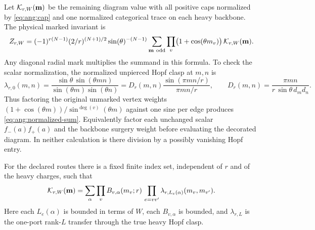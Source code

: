 Let \({\cal K}_{r,W}(\mathbf m)\) be the remaining diagram value with all positive caps normalized by \eqref{eq:ang:cap} and one normalized categorical trace on each heavy backbone. The physical marked invariant is
\begin{equation}
 \label{eq:ang:normalized-sum}
 Z_{r,W}=(-1)^{r(N-1)}
      (2/r)^{(N+1)/2}\sin(\theta)^{-(N-1)}
      \sum_{\mathbf m\ {\rm odd}}
        \prod_v \bigl(1+\cos(\theta m_v)\bigr)\,
                            {\cal K}_{r,W}(\mathbf m).
\end{equation}
Any diagonal radial mark multiplies the summand in this formula. To check the scalar normalization, the normalized unpierced Hopf clasp at \(m,n\) is
\[
 \lambda_{r,0}(m,n)=
 \frac{\sin\theta\,\sin(\theta mn)}{\sin(\theta m)\sin(\theta n)}
   =D_r(m,n)\frac{\sin(\pi mn/r)}{\pi mn/r},
 \qquad
 D_r(m,n)=\frac{\pi mn}{r\,\sin\theta\, d_m d_n}.
\]
Thus factoring the original unmarked vertex weights
\((1+\cos(\theta m))/\sin^{\deg(v)}(\theta m)\) against one sine per edge produces \eqref{eq:ang:normalized-sum}. Equivalently factor each unchanged scalar \(f_-(a)f_+(a)\) and the backbone surgery weight before evaluating the decorated diagram. In neither calculation is there division by a possibly vanishing Hopf entry.

\begin{lemma}\label{lem:ang:network}
For the declared routes there is a fixed finite index set, independent of \(r\) and of the heavy charges, such that
\begin{equation}
 \label{eq:ang:network}
 {\cal K}_{r,W}(\mathbf m)
  =\sum_\alpha
       \prod_v B_{v,\alpha}(m_v;r)\,
       \prod_{e=vv'}\lambda_{r,L_e(\alpha)}(m_v,m_{v'}).
\end{equation}
Here each \(L_e(\alpha)\) is bounded in terms of \(W\), each \(B_{v,\alpha}\) is bounded, and \(\lambda_{r,L}\) is the one-port rank-\(L\) transfer through the true heavy Hopf clasp.
\end{lemma}

